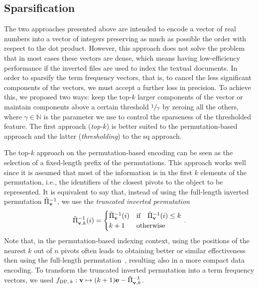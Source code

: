 \subsection{Sparsification}
The two approaches presented above are intended to encode a vector of real numbers into a vector of integers preserving as much as possible the order with respect to the dot product.
However, this approach does not solve the problem that in most cases these vectors are dense, which means having low-efficiency performance if the inverted files are used to index the textual documents.
In order to sparsify the term frequency vectors, that is, to cancel the less significant components of the vectors, we must accept a further loss in precision.
To achieve this, we proposed two ways: keep the top-$k$ larger components of the vector or maintain components above a certain threshold $\sfrac{1}{\gamma}$ by zeroing all the others, where $\gamma \in \mathbb{N}$ is the parameter we use to control the sparseness of the thresholded feature.
The first approach (\emph{top-$k$}) is better suited to the permutation-based approach and the latter (\emph{thresholding}) to the \gls{sq} approach.

The top-$k$ approach on the permutation-based encoding can be seen as the selection of a fixed-length prefix of the permutations.
This approach works well since it is assumed that most of the information is in the first $k$ elements of the permutation, i.e., the identifiers of the closest pivots to the object to be represented.
It is equivalent to say that, instead of using the full-length inverted permutation $\tilde{\Pi}^{-1}_{\mathbf{v}}$, we use the \emph{truncated inverted permutation}
\begin{equation}
\tilde{\Pi}^{-1}_{\mathbf{v},k}(i) = \begin{cases}
                                \tilde{\Pi}^{-1}_{\mathbf{v}} (i) & \text{if} \quad \tilde{\Pi}^{-1}_{\mathbf{v}}(i) \leq k \\
                                k+1                       & \text{otherwise}
                             \end{cases} \,.
\end{equation}
Note that, in the permutation-based indexing context, using the positions of the {nearest} $k$ out of $n$ pivots often leads to obtaining better or similar effectiveness then using the full-length permutation~\cite{amato2014mi,amato2014some}, resulting also in a more compact data encoding.
To transform the truncated inverted permutation into a term frequency vectors, we used $f_{\text{DP},\,k} : \mathbf{v} \mapsto (k+1)\mathbf{e} -\tilde{\Pi}^{-1}_{\mathbf{v},k}$.

